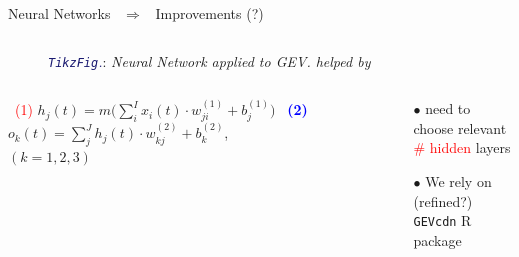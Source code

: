 \documentclass[9pt,xcolor={dvipsnames}]{beamer}
\begin{document}
\begin{frame}[fragile, t]{Neural Networks \ $\Rightarrow$ \ Improvements (?)}
\begin{columns}[T]
\begin{column}{.6\textwidth}
\begin{figure}
{{
	}
}
\vspace{-2.5mm}
\caption{\tiny \textcolor{MidnightBlue}{\emph{\texttt{TikzFig}.}}:\emph{ Neural Network applied to GEV. helped by \textcolor{JungleGreen}{\cite{cannon_flexible_2010}}} }
\end{figure}

\vspace{-.65cm}

\newenvironment{variableblock}[3]{%
	\setbeamercolor{block body}{#2}
	\setbeamercolor{block title}{#3}
	\begin{block}{#1}}{\end{block}}

\begin{columns}[c]
	
\begin{column}[]{.68\textwidth}\fontsize{6.5}{7}\selectfont
\begin{block}{\scriptsize \centering \qquad \ \quad \textcolor{red}{(1)}  $h_j(t)=m\Big(\sum_i^Ix_i(t)\cdot w_{ji}^{(1)}+b_j^{(1)}\Big)$}
 \centering \quad \quad \
  \textcolor{blue}{\textbf{(2)}} $o_k(t)=\sum_j^Jh_j(t)\cdot w_{kj}^{(2)}+b^{(2)}_k$,\\ \qquad $ (k=1,2,3)$
\end{block}
\end{column}



\begin{column}[]{.65\textwidth}\fontsize{6.5}{7}\selectfont
\begin{itemize}
	\item[$\bullet$] 	need to choose relevant \\ \textcolor{red}{\# hidden}  layers
	\item[$\bullet$] We rely on (refined?) \\ \texttt{GEVcdn} R package 
\end{itemize}
\end{column}


\end{columns}
\end{column}
\end{columns}
\end{frame}
\end{document}
